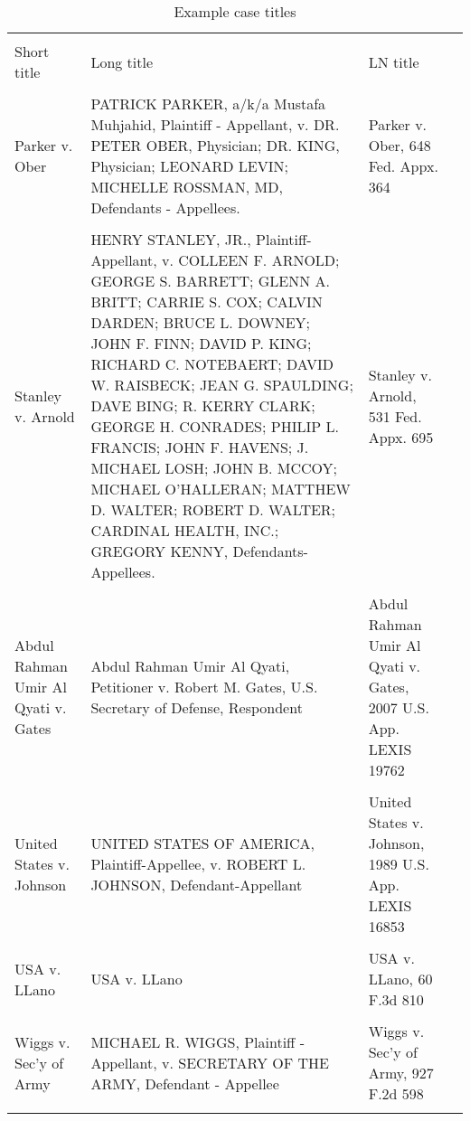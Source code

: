 \documentclass[10pt, letterpaper]{article}
\begin{document}
\begin{spacing}{1.0}
\begin{itemize}
\end{itemize}

\begin{table}[H]
    \centering
    \caption{Example case titles}
    \footnotesize
    \begin{tabular}{>{\raggedright}p{1.5in}>{\raggedright}p{3in}>{\raggedright}p{1.5in}p{0in}}
        \hline\\[-6pt]
        Short title & Long title & LN title &\\[2pt]
        \hline\\[-6pt]
        Parker v. Ober & PATRICK PARKER, a/k/a Mustafa Muhjahid, Plaintiff - Appellant, v. DR. PETER OBER, Physician; DR. KING, Physician; LEONARD LEVIN; MICHELLE ROSSMAN, MD, Defendants - Appellees. & Parker v. Ober, 648 Fed. Appx. 364 &\\
        & & &\\[-4pt]
        Stanley v. Arnold & HENRY STANLEY, JR., Plaintiff-Appellant, v. COLLEEN F. ARNOLD; GEORGE S. BARRETT; GLENN A. BRITT; CARRIE S. COX; CALVIN DARDEN; BRUCE L. DOWNEY; JOHN F. FINN; DAVID P. KING; RICHARD C. NOTEBAERT; DAVID W. RAISBECK; JEAN G. SPAULDING; DAVE BING; R. KERRY CLARK; GEORGE H. CONRADES; PHILIP L. FRANCIS; JOHN F. HAVENS; J. MICHAEL LOSH; JOHN B. MCCOY; MICHAEL O'HALLERAN; MATTHEW D. WALTER; ROBERT D. WALTER; CARDINAL HEALTH, INC.; GREGORY KENNY, Defendants-Appellees. & Stanley v. Arnold, 531 Fed. Appx. 695 &\\
        & & &\\[-4pt]
        Abdul Rahman Umir Al Qyati v. Gates & Abdul Rahman Umir Al Qyati, Petitioner v. Robert M. Gates, U.S. Secretary of Defense, Respondent & Abdul Rahman Umir Al Qyati v. Gates, 2007 U.S. App. LEXIS 19762 &\\
        & & &\\[-4pt]
        United States v. Johnson & UNITED STATES OF AMERICA, Plaintiff-Appellee, v. ROBERT L. JOHNSON, Defendant-Appellant & United States v. Johnson, 1989 U.S. App. LEXIS 16853 &\\
        & & &\\[-4pt]
        USA v. LLano & USA v. LLano & USA v. LLano, 60 F.3d 810 &\\
        & & &\\[-4pt]
        Wiggs v. Sec'y of Army & MICHAEL R. WIGGS, Plaintiff - Appellant, v. SECRETARY OF THE ARMY, Defendant - Appellee & Wiggs v. Sec'y of Army, 927 F.2d 598 &\\
        & & &\\[-4pt]

\end{tabular}
\end{table}
\end{spacing}
\end{document}
